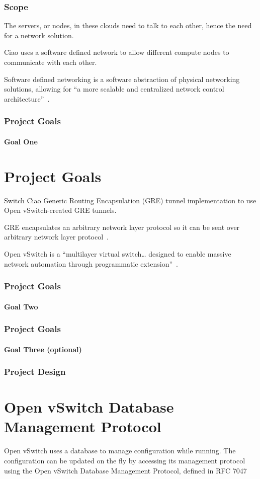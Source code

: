 \documentclass[pdf]{beamer}
\begin{document}
\begin{frame}
	\frametitle{Scope}
	The servers, or nodes, in these clouds need to talk to each other, hence
	the need for a network solution.

	Ciao uses a software defined network to allow different compute nodes to
	communicate with each other.

	Software defined networking is a software abstraction of physical
	networking solutions, allowing for ``a more scalable and centralized
	network control architecture''~\cite{goransson}.
\end{frame}

\begin{frame}
	\frametitle{Project Goals}
	\framesubtitle{Goal One}
	\section{Project Goals}
	Switch Ciao Generic Routing Encapsulation (GRE) tunnel implementation to
	use Open vSwitch-created GRE tunnels.

	\begin{description}[style=nextline]
		\item[Generic Routing Encapsulation (GRE)]
			GRE encapsulates an arbitrary network layer protocol so
			it can be sent over arbitrary network layer
			protocol~\cite{rfc1701}.
		\item[Open vSwitch (OVS)]
			Open vSwitch is a ``multilayer virtual switch\ldots
			designed to enable massive network automation through
			programmatic extension''~\cite{ovs}.
	\end{description}
\end{frame}

\begin{frame}
	\frametitle{Project Goals}
	\framesubtitle{Goal Two}
\end{frame}

\begin{frame}
	\frametitle{Project Goals}
	\framesubtitle{Goal Three (optional)}
\end{frame}

\begin{frame}
	\frametitle{Project Design}
	\section{Open vSwitch Database Management Protocol}
	Open vSwitch uses a database to manage configuration while running.
	The configuration can be updated on the fly by accessing its management
	protocol using the Open vSwitch Database Management Protocol, defined
	in RFC 7047\cite{rfc7047}
\end{frame}
\end{document}
